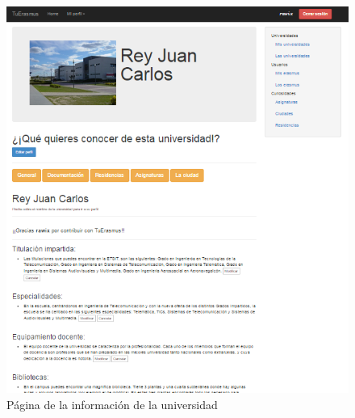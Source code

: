 \begin{figure}[htbp]
	
	\centering
	\includegraphics[scale=0.5]{./Figuras/tuerasmusPages/privatePages/uniInfo.png}
	\caption{P\'agina de la informaci\'on de la universidad}
	\label{fig:uniI}
	
\end{figure}
